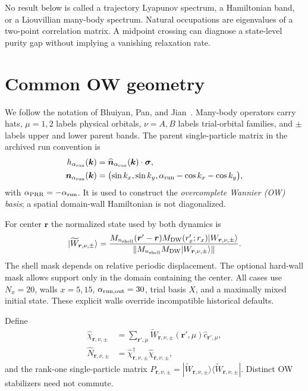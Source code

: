 \documentclass[aps,prb,twocolumn,nofootinbib,superscriptaddress,floatfix]{revtex4-2}
\begin{document}
No result below is called a trajectory Lyapunov spectrum, a Hamiltonian band, or a
Liouvillian many-body spectrum.  Natural occupations are eigenvalues of a two-point
correlation matrix.  A midpoint crossing can diagnose a state-level purity gap without
implying a vanishing relaxation rate.

\section{Common OW geometry}

We follow the notation of Bhuiyan, Pan, and Jian~\cite{Bhuiyan2026}.  Many-body
operators carry hats, $\mu=1,2$ labels physical orbitals, $\nu=A,B$ labels trial-orbital
families, and $\pm$ labels upper and lower parent bands.  The parent single-particle
matrix in the archived run convention is
\begin{align}
 h_{\alpha_{\rm run}}(\boldsymbol k)
 &=\widehat{\boldsymbol n}_{\alpha_{\rm run}}(\boldsymbol k)\cdot\boldsymbol\sigma,
 \\
 \boldsymbol n_{\alpha_{\rm run}}(\boldsymbol k)
 &=\bigl(\sin k_x,\sin k_y,
 \alpha_{\rm run}-\cos k_x-\cos k_y\bigr),
 \label{eq:parent}
\end{align}
with $\alpha_{\rm PRR}=-\alpha_{\rm run}$.  It is used to construct the
\textit{overcomplete Wannier (OW) basis}; a spatial domain-wall Hamiltonian is not
diagonalized.

For center $\boldsymbol r$ the normalized state used by both dynamics is
\begin{equation}
 |\widetilde W_{\boldsymbol r,\nu,\pm}\rangle=
 \frac{M_{n_{\rm shell}}(\boldsymbol r'-\boldsymbol r)
 M_{\rm DW}(r'_x;r_x)|W_{\boldsymbol r,\nu,\pm}\rangle}
 {\|M_{n_{\rm shell}}M_{\rm DW}|W_{\boldsymbol r,\nu,\pm}\rangle\|}.
 \label{eq:ow}
\end{equation}
The shell mask depends on relative periodic displacement.  The optional hard-wall mask
allows support only in the domain containing the center.  All cases use
$N_x=20$, walls $x=5,15$, $\alpha_{\rm run,out}=30$, trial basis $X$, and a maximally
mixed initial state.  These explicit walls override incompatible historical defaults.

Define
\begin{align}
 \hat\chi_{\boldsymbol r,\nu,\pm}
 &=\sum_{\boldsymbol r',\mu}
 \widetilde W_{\boldsymbol r,\nu,\pm}(\boldsymbol r',\mu)
 \hat c_{\boldsymbol r',\mu},\\
 \hat N_{\boldsymbol r,\nu,\pm}
 &=\hat\chi_{\boldsymbol r,\nu,\pm}^{\dagger}
 \hat\chi_{\boldsymbol r,\nu,\pm},
\end{align}
and the rank-one single-particle matrix
$P_{\boldsymbol r,\nu,\pm}=|\widetilde W_{\boldsymbol r,\nu,\pm}\rangle
\langle\widetilde W_{\boldsymbol r,\nu,\pm}|$.  Distinct OW stabilizers need not
commute.
\end{document}
